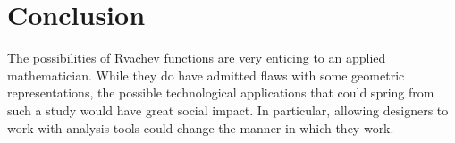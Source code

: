 \documentclass[a4paper]{article}
\begin{document}

\section{Conclusion}

The possibilities of Rvachev functions are very enticing to an applied mathematician. While they do have admitted flaws with some geometric representations, the possible technological applications that could spring from such a study would have great social impact. In particular, allowing designers to work with analysis tools could change the manner in which they work. 



\end{document}
